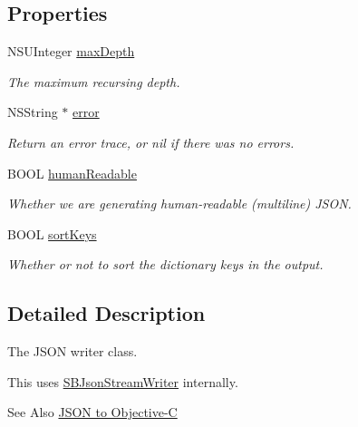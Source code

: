 \subsection*{Properties}
\begin{DoxyCompactItemize}
\item 
N\-S\-U\-Integer \hyperlink{interface_s_b_json_writer_a283b4f65ab4d3e1a8112b37dea432689}{max\-Depth}
\begin{DoxyCompactList}\small\item\em The maximum recursing depth. \end{DoxyCompactList}\item 
N\-S\-String $\ast$ \hyperlink{interface_s_b_json_writer_abc3f1e7299df08c56837d6c8ad135421}{error}
\begin{DoxyCompactList}\small\item\em Return an error trace, or nil if there was no errors. \end{DoxyCompactList}\item 
B\-O\-O\-L \hyperlink{interface_s_b_json_writer_a16ca84860a2ee76a03b567dc5181a851}{human\-Readable}
\begin{DoxyCompactList}\small\item\em Whether we are generating human-\/readable (multiline) J\-S\-O\-N. \end{DoxyCompactList}\item 
B\-O\-O\-L \hyperlink{interface_s_b_json_writer_af25807a58a322b56cb5d3593532228e5}{sort\-Keys}
\begin{DoxyCompactList}\small\item\em Whether or not to sort the dictionary keys in the output. \end{DoxyCompactList}\end{DoxyCompactItemize}


\subsection{Detailed Description}
The J\-S\-O\-N writer class. 

This uses \hyperlink{interface_s_b_json_stream_writer}{S\-B\-Json\-Stream\-Writer} internally.

\begin{DoxySeeAlso}{See Also}
\hyperlink{json2objc}{J\-S\-O\-N to Objective-\/\-C} 
\end{DoxySeeAlso}


